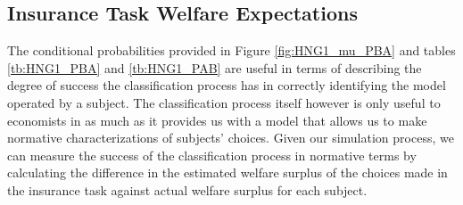 \documentclass[../main.tex]{subfiles}
\begin{document}
%
%

\subsection{\texorpdfstring{\textcite{Harrison2016}}{Harrison and Ng (2016)} Insurance Task Welfare Expectations}
\label{sec4:WT}

The conditional probabilities provided in Figure \ref{fig:HNG1_mu_PBA} and tables \ref{tb:HNG1_PBA} and \ref{tb:HNG1_PAB} are useful in terms of describing the degree of success the classification process has in correctly identifying the model operated by a subject.
The classification process itself however is only useful to economists in as much as it provides us with a model that allows us to make normative characterizations of subjects' choices.
Given our simulation process, we can measure the success of the classification process in normative terms by calculating the difference in the estimated welfare surplus of the choices made in the \textcite{Harrison2016} insurance task against actual welfare surplus for each subject.
\end{document}
